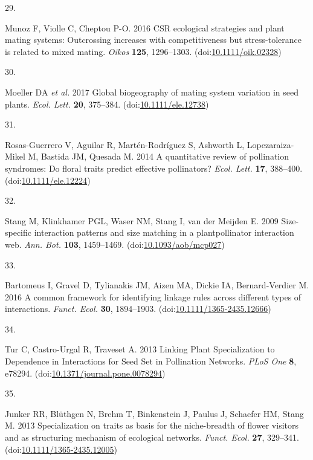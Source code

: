 \documentclass[
  12pt,
  a4paper,
]{article}
\newlength{\cslhangindent}
\newlength{\csllabelwidth}
\newlength{\cslentryspacingunit} %
\newenvironment{CSLReferences}[2] %
 {%
  \setlength{\parindent}{0pt}
  \ifodd #1
  \let\oldpar\par
  \def\par{\hangindent=\cslhangindent\oldpar}
  \fi
  \setlength{\parskip}{#2\cslentryspacingunit}
 }%
 {}
\newcommand{\CSLLeftMargin}[1]{\parbox[t]{\csllabelwidth}{#1}}
\newcommand{\CSLRightInline}[1]{\parbox[t]{\linewidth - \csllabelwidth}{#1}\break}
\begin{document}
\begin{CSLReferences}{0}{0}
\leavevmode{}%
\CSLLeftMargin{29. }
\CSLRightInline{Munoz F, Violle C, Cheptou P-O. 2016 {CSR} ecological strategies and plant mating systems: Outcrossing increases with competitiveness but stress-tolerance is related to mixed mating. \emph{Oikos} \textbf{125}, 1296--1303. (doi:\href{https://doi.org/10.1111/oik.02328}{10.1111/oik.02328})}

\leavevmode{}%
\CSLLeftMargin{30. }
\CSLRightInline{Moeller DA \emph{et al.} 2017 Global biogeography of mating system variation in seed plants. \emph{Ecol. Lett.} \textbf{20}, 375--384. (doi:\href{https://doi.org/10.1111/ele.12738}{10.1111/ele.12738})}

\leavevmode{}%
\CSLLeftMargin{31. }
\CSLRightInline{Rosas-Guerrero V, Aguilar R, Martén-Rodríguez S, Ashworth L, Lopezaraiza-Mikel M, Bastida JM, Quesada M. 2014 A quantitative review of pollination syndromes: Do floral traits predict effective pollinators? \emph{Ecol. Lett.} \textbf{17}, 388--400. (doi:\href{https://doi.org/10.1111/ele.12224}{10.1111/ele.12224})}

\leavevmode{}%
\CSLLeftMargin{32. }
\CSLRightInline{Stang M, Klinkhamer PGL, Waser NM, Stang I, van der Meijden E. 2009 Size-specific interaction patterns and size matching in a plant\textendash pollinator interaction web. \emph{Ann. Bot.} \textbf{103}, 1459--1469. (doi:\href{https://doi.org/10.1093/aob/mcp027}{10.1093/aob/mcp027})}

\leavevmode{}%
\CSLLeftMargin{33. }
\CSLRightInline{Bartomeus I, Gravel D, Tylianakis JM, Aizen MA, Dickie IA, Bernard-Verdier M. 2016 A common framework for identifying linkage rules across different types of interactions. \emph{Funct. Ecol.} \textbf{30}, 1894--1903. (doi:\href{https://doi.org/10.1111/1365-2435.12666}{10.1111/1365-2435.12666})}

\leavevmode{}%
\CSLLeftMargin{34. }
\CSLRightInline{Tur C, Castro-Urgal R, Traveset A. 2013 Linking {Plant Specialization} to {Dependence} in {Interactions} for {Seed Set} in {Pollination Networks}. \emph{PLoS One} \textbf{8}, e78294. (doi:\href{https://doi.org/10.1371/journal.pone.0078294}{10.1371/journal.pone.0078294})}

\leavevmode{}%
\CSLLeftMargin{35. }
\CSLRightInline{Junker RR, Blüthgen N, Brehm T, Binkenstein J, Paulus J, Schaefer HM, Stang M. 2013 Specialization on traits as basis for the niche-breadth of flower visitors and as structuring mechanism of ecological networks. \emph{Funct. Ecol.} \textbf{27}, 329--341. (doi:\href{https://doi.org/10.1111/1365-2435.12005}{10.1111/1365-2435.12005})}


\end{CSLReferences}
\end{document}
